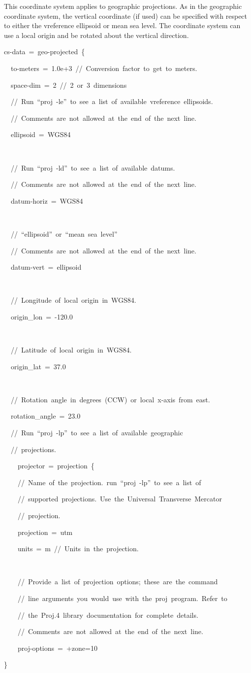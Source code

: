 This coordinate system applies to geographic projections. As in the
geographic coordinate system, the vertical coordinate (if used) can
be specified with respect to either the vreference ellipsoid or mean
sea level. The coordinate system can use a local origin and be rotated
about the vertical direction.
\begin{lyxcode}
cs-data~=~geo-projected~\{

~~to-meters~=~1.0e+3~//~Conversion~factor~to~get~to~meters.

~~space-dim~=~2~//~2~or~3~dimensions



~~//~Run~``proj~-le''~to~see~a~list~of~available~vreference~ellipsoids.

~~//~Comments~are~not~allowed~at~the~end~of~the~next~line.

~~ellipsoid~=~WGS84

~

~~//~Run~``proj~-ld''~to~see~a~list~of~available~datums.

~~//~Comments~are~not~allowed~at~the~end~of~the~next~line.

~~datum-horiz~=~WGS84

~

~~//~``ellipsoid''~or~``mean~sea~level''

~~//~Comments~are~not~allowed~at~the~end~of~the~next~line.

~~datum-vert~=~ellipsoid

~

~~//~Longitude~of~local~origin~in~WGS84.

~~origin\_lon~=~-120.0

~~

~~//~Latitude~of~local~origin~in~WGS84.

~~origin\_lat~=~37.0

~

~~//~Rotation~angle~in~degrees~(CCW)~or~local~x-axis~from~east.

~~rotation\_angle~=~23.0



~~//~Run~``proj~-lp''~to~see~a~list~of~available~geographic~

~~//~projections.

~~~~projector~=~projection~\{

~~~~//~Name~of~the~projection.~run~``proj~-lp''~to~see~a~list~of~

~~~~//~supported~projections.~Use~the~Universal~Transverse~Mercator

~~~~//~projection.

~~~~projection~=~utm

~~~~units~=~m~//~Units~in~the~projection.

~

~~~~//~Provide~a~list~of~projection~options;~these~are~the~command~

~~~~//~line~arguments~you~would~use~with~the~proj~program.~Refer~to

~~~~//~the~Proj.4~library~documentation~for~complete~details.

~~~~//~Comments~are~not~allowed~at~the~end~of~the~next~line.

~~~~proj-options~=~+zone=10

\}
\end{lyxcode}
